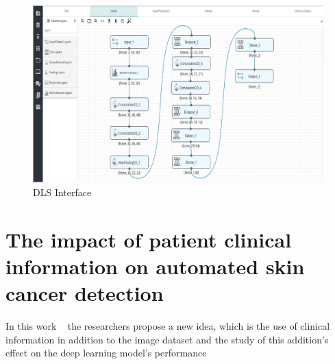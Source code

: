 \begin{figure}[htbp]
\begin{center}
\includegraphics[width=12cm]{./chapter-03-state-of-the-art/dls.png}
\end{center}
\caption{DLS Interface}
\label{fig:dls}
\end{figure}





\section{The impact of patient clinical information on automated skin cancer detection}
In this work ~\cite{Pacheco2020} the researchers propose a new idea, which is the use  of clinical information in addition to the image dataset and the study of this addition's effect on the deep learning model's performance

